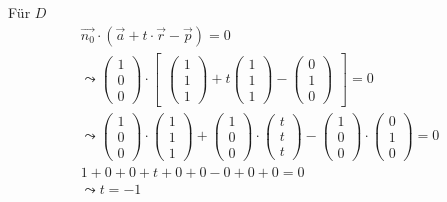 Für \ensuremath{D}  %
\begin{gather}
\vec{n_0} \cdot (\vec{a}+t\cdot \vec{r}-\vec{p})=0\\
\leadsto 
\begin{pmatrix}
1\\0\\0
\end{pmatrix} \cdot 
\begin{bmatrix}
\begin{pmatrix}
1\\1\\1
\end{pmatrix}
+ t
\begin{pmatrix}
1\\1\\1
\end{pmatrix}
-
\begin{pmatrix}
0\\1\\0
\end{pmatrix}
\end{bmatrix} = 0\\
\leadsto
\begin{pmatrix}
1\\0\\0
\end{pmatrix}\cdot
\begin{pmatrix}
1\\1\\1
\end{pmatrix}
+
\begin{pmatrix}
1\\0\\0
\end{pmatrix}
\cdot
\begin{pmatrix}
t\\t\\t
\end{pmatrix}
-
\begin{pmatrix}
1\\0\\0
\end{pmatrix}
\cdot
\begin{pmatrix}
0\\1\\0
\end{pmatrix} =0\\
1+0+0+t+0+0-0+0+0=0\\
\leadsto t=-1
\end{gather} 
